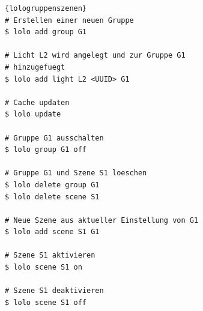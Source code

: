 \documentclass[a4paper,12pt]{article}
\begin{document}
\begin{lstlisting}[caption=Bedienung von Gruppen und Szenen,
                   basicstyle=\footnotesize\ttfamily]{lologruppenszenen}
# Erstellen einer neuen Gruppe
$ lolo add group G1

# Licht L2 wird angelegt und zur Gruppe G1
# hinzugefuegt
$ lolo add light L2 <UUID> G1

# Cache updaten
$ lolo update

# Gruppe G1 ausschalten
$ lolo group G1 off

# Gruppe G1 und Szene S1 loeschen
$ lolo delete group G1
$ lolo delete scene S1

# Neue Szene aus aktueller Einstellung von G1
$ lolo add scene S1 G1

# Szene S1 aktivieren
$ lolo scene S1 on

# Szene S1 deaktivieren
$ lolo scene S1 off

\end{lstlisting}

\newpage

\printglossary[type=\acronymtype,title=Abkürzungsverzeichnis]

\newpage

\printglossary
\end{document}
